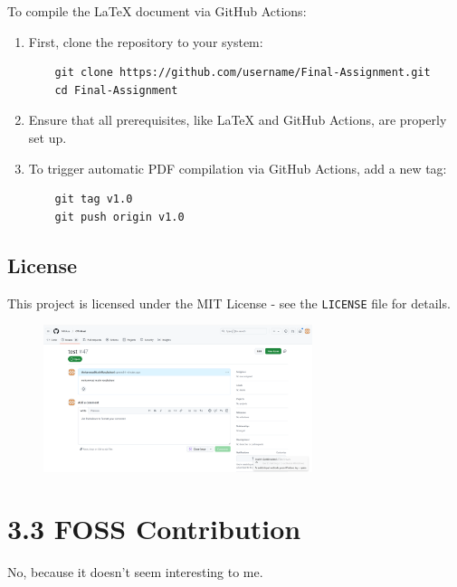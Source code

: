 \documentclass{article}
\begin{document}
To compile the LaTeX document via GitHub Actions:

\begin{enumerate}
    \item First, clone the repository to your system:
    \begin{verbatim}
    git clone https://github.com/username/Final-Assignment.git
    cd Final-Assignment
    \end{verbatim}

    \item Ensure that all prerequisites, like LaTeX and GitHub Actions, are properly set up.
    
    \item To trigger automatic PDF compilation via GitHub Actions, add a new tag:
    \begin{verbatim}
    git tag v1.0
    git push origin v1.0
    \end{verbatim}
\end{enumerate}

\subsection*{License}

This project is licensed under the MIT License - see the \texttt{LICENSE} file for details.



\begin{figure}[h!]
    \centering
    \includegraphics[width=0.7\textwidth]{mili.png}
\end{figure}









\section*{3.3 FOSS Contribution}

No, because it doesn't seem interesting to me.
\end{document}
